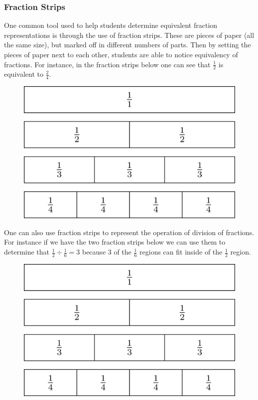 \documentclass[
]{book}
\theoremstyle{definition}
\theoremstyle{definition}
\theoremstyle{definition}
\theoremstyle{remark}
\begin{document}
\hypertarget{fraction-strips}{%
\subsubsection{Fraction Strips}\label{fraction-strips}}

One common tool used to help students determine equivalent fraction representations is through the use of fraction strips. These are pieces of paper (all the same size), but marked off in different numbers of parts. Then by setting the pieces of paper next to each other, students are able to notice equivalency of fractions. For instance, in the fraction strips below one can see that \(\frac{1}{2}\) is equivalent to \(\frac{2}{4}\).

\begin{figure}

{\centering \includegraphics[width=0.6\linewidth]{tikz/fraction-strip1} 

}

\end{figure}

One can also use fraction strips to represent the operation of division of fractions. For instance if we have the two fraction strips below we can use them to determine that \(\frac{1}{2} \div \frac{1}{6} = 3\) because \(3\) of the \(\frac{1}{6}\) regions can fit inside of the \(\frac{1}{2}\) region.

\begin{figure}

{\centering \includegraphics[width=0.6\linewidth]{tikz/fraction-strip1} 

}

\end{figure}
\end{document}
